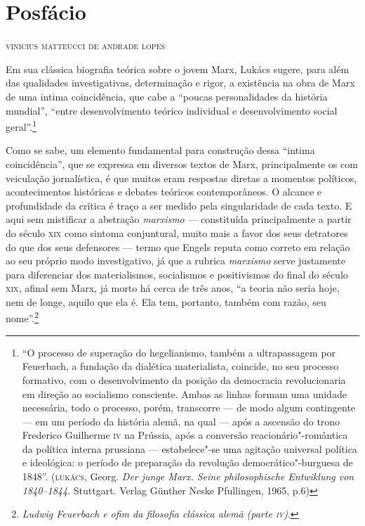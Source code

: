 \pagebreak
\thispagestyle{empty}
\movetooddpage
\chapter[Posfácio]{Posfácio }

\begin{flushright}
\textsc{vinicius matteucci de andrade lopes}
\end{flushright}

\noindent{}Em sua clássica biografia teórica sobre o jovem Marx, Lukács sugere,
para além das qualidades investigativas, determinação e rigor, a
existência na obra de Marx de uma intima coincidência, que cabe a
``poucas personalidades da história mundial'', ``entre desenvolvimento
teórico individual e desenvolvimento social geral''.\footnote{``O
  processo de superação do hegelianismo, também a ultrapassagem por
  Feuerbach, a fundação da dialética materialista, coincide, no seu
  processo formativo, com o desenvolvimento da posição da democracia
  revolucionaria em direção ao socialismo consciente. Ambas as linhas
  formam uma unidade necessária, todo o processo, porém, transcorre ---
  de modo algum contingente --- em um período da história alemã, na qual
  --- após a ascensão do trono Frederico Guilherme \textsc{iv} na
  Prússia, após a conversão reacionário"-romântica da política interna
  prussiana --- estabelece"-se uma agitação universal política e
  ideológica: o período de preparação da revolução democrático"-burguesa
  de 1848''. (\textsc{lukács}, Georg. \emph{Der junge Marx. Seine
  philosophische Entwiklung von 1840--1844}. Stuttgart. Verlag Günther
  Neske Pfullingen, 1965, p.6)}

Como se sabe, um elemento fundamental para construção dessa ``intima
coincidência'', que se expressa em diversos textos de Marx,
principalmente os com veiculação jornalística, é que muitos eram
respostas diretas a momentos políticos, acontecimentos históricas e
debates teóricos contemporâneos. O alcance e profundidade da crítica é
traço a ser medido pela singularidade de cada texto. E aqui sem
mistificar a abstração \emph{marxismo} --- constituída principalmente a
partir do século \textsc{xix} como sintoma conjuntural, muito mais a
favor dos seus detratores do que dos seus defensores --- termo que
Engels reputa como correto em relação ao seu próprio modo investigativo,
já que a rubrica \emph{marxismo} serve justamente para diferenciar dos
materialismos, socialismos e positivismos do final do século
\textsc{xix}, afinal sem Marx, já morto há cerca de três anos, ``a
teoria não seria hoje, nem de longe, aquilo que ela é. Ela tem,
portanto, também com razão, seu nome''.\footnote{\emph{Ludwig Feuerbach
  e ofim da filosofia clássica alemã (parte \textsc{iv})}.}

